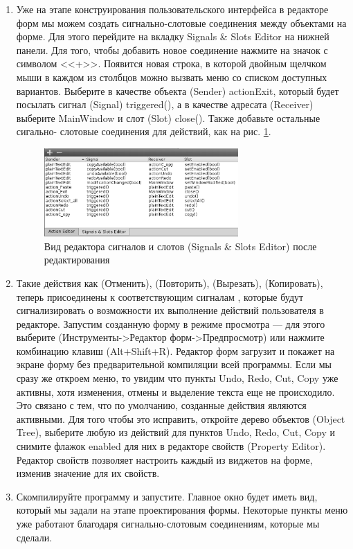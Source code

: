 \begin{enumerate}
\item Уже на этапе конструирования пользовательского интерфейса в редакторе форм мы можем создать сигнально-слотовые
соединения между объектами на форме. Для этого перейдите на вкладку Signals \& Slots Editor на нижней панели. Для того,
чтобы добавить новое соединение нажмите на значок с символом <<+>>. Появится новая строка, в которой
двойным щелчком мыши в каждом из столбцов можно вызвать меню со списком доступных вариантов. Выберите в качестве
объекта (Sender) actionExit, который будет посылать сигнал (Signal) triggered(), а в качестве адресата (Receiver)
выберите MainWindow и слот (Slot) close(). Также добавьте остальные сигально- слотовые соединения для действий, как на
рис. \ref{ch15:refDrawing6}.

\begin{figure}[htb]
\begin{center}
\includegraphics[width=0.7\textwidth]{img/ris_15_7}
\caption[Вид редактора сигналов и слотов (Signals \& Slots Editor) после редактирования]{Вид
редактора сигналов и слотов (Signals \& Slots Editor) после редактирования}
\label{ch15:refDrawing6}
\end{center}
\end{figure}

\item Такие действия как  (Отменить),  (Повторить),  (Вырезать), 
 (Копировать), теперь присоединены к соответствующим сигналам , 
которые будут сигнализировать о возможности их выполнение действий
пользователя в редакторе. Запустим созданную форму в режиме просмотра --- для этого выберите  (Инструменты->Редактор форм->Предпросмотр) или нажмите комбинацию клавиш (Alt+Shift+R). 
Редактор форм загрузит и покажет на экране
форму без предварительной компиляции всей программы. Если мы сразу же откроем меню, 
то увидим что пункты Undo, Redo, Cut, Copy уже активны, хотя изменения, отмены и выделение текста еще не происходило. 
Это связано с тем, что по умолчанию, созданные действия являются активными. Для того чтобы это исправить, откройте дерево объектов (Object Tree), выберите любую из действий для пунктов Undo, Redo, Cut, Copy и 
снимите флажок enabled для них в редакторе свойств (Property Editor). Редактор свойств позволяет настроить каждый из виджетов на форме, изменив значение для их свойств. 
\item Скомпилируйте программу и запустите. Главное окно будет иметь вид, который мы задали на этапе проектирования
формы. Некоторые пункты меню уже работают благодаря сигнально-слотовым соединениям, которые мы сделали.
\end{enumerate}

